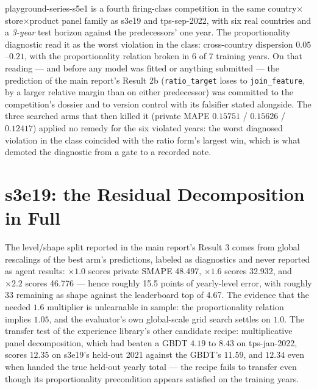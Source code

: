 \documentclass[11pt,a4paper]{article}
\begin{document}
playground-series-s5e1 is a fourth firing-class competition in the same
country$\times$store$\times$product panel family as s3e19 and tps-sep-2022, with six real
countries and a \emph{3-year} test horizon against the predecessors' one year. The
proportionality diagnostic read it as the worst violation in the class: cross-country
dispersion $0.05$--$0.21$, with the proportionality relation broken in 6 of 7 training years.
On that reading --- and before any model was fitted or anything submitted --- the prediction of
the main report's Result 2b (\texttt{ratio\_target} loses to \texttt{join\_feature}, by a
larger relative margin than on either predecessor) was committed to the competition's dossier
and to version control with its falsifier stated alongside. The three searched arms that then
killed it (private MAPE $0.15751$ / $0.15626$ / $0.12417$) applied no remedy for the six
violated years: the worst diagnosed violation in the class coincided with the ratio form's
largest win, which is what demoted the diagnostic from a gate to a recorded note.

\section{s3e19: the Residual Decomposition in Full}

The level/shape split reported in the main report's Result 3 comes from global rescalings of
the best arm's predictions, labeled as diagnostics and never reported as agent results:
$\times 1.0$ scores private SMAPE 48.497, $\times 1.6$ scores 32.932, and $\times 2.2$ scores
46.776 --- hence roughly 15.5 points of yearly-level error, with roughly 33 remaining as shape
against the leaderboard top of 4.67. The evidence that the needed $1.6$ multiplier is
unlearnable in sample: the proportionality relation implies $1.05$, and the evaluator's own
global-scale grid search settles on $1.0$. The transfer test of the experience library's other
candidate recipe: multiplicative panel decomposition, which had beaten a GBDT $4.19$ to $8.43$
on tps-jan-2022, scores $12.35$ on s3e19's held-out 2021 against the GBDT's $11.59$, and
$12.34$ even when handed the true held-out yearly total --- the recipe fails to transfer even
though its proportionality precondition appears satisfied on the training years.
\end{document}
